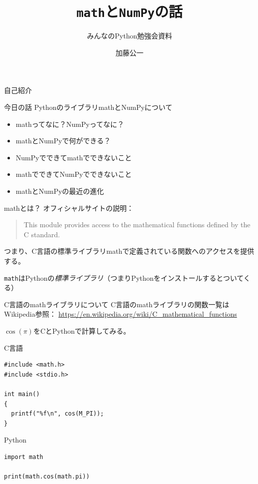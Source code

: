 \documentclass[unicode,lualatex,aspectratio=169]{beamer}
\title{{\tt math}と{\tt NumPy}の話}
\subtitle{みんなのPython勉強会資料}
\date{}
\author{加藤公一}
\begin{document}
\begin{frame}
 \titlepage
\end{frame}
\begin{frame}[fragile]{自己紹介}
\end{frame}
\begin{frame}[fragile]{今日の話}
  PythonのライブラリmathとNumPyについて
  \begin{itemize}
  \item mathってなに？NumPyってなに？
  \item mathとNumPyで何ができる？
  \item NumPyでできてmathでできないこと
  \item mathでできてNumPyでできないこと
  \item mathとNumPyの最近の進化
  \end{itemize}
\end{frame}
\begin{frame}[fragile]{mathとは？}
  オフィシャルサイトの説明：
  \begin{quote}
    This module provides access to the mathematical functions defined by the C standard.
  \end{quote}

  つまり、C言語の標準ライブラリmathで定義されている関数へのアクセスを提供する。

  {\tt math}はPythonの\emph{標準ライブラリ}（つまりPythonをインストールするとついてくる）
\end{frame}
\begin{frame}[fragile]{C言語のmathライブラリについて}
  C言語のmathライブラリの関数一覧はWikipedia参照：\newline
  {\tiny \url{https://en.wikipedia.org/wiki/C\_mathematical\_functions}}

$\cos(\pi)$をCとPythonで計算してみる。
\begin{minipage}[t]{0.45 \textwidth}
\fontsize{6pt}{6pt}\selectfont    
\noindent  
C言語
\begin{verbatim}
#include <math.h>
#include <stdio.h>

int main()
{
  printf("%f\n", cos(M_PI));
}
\end{verbatim}
\end{minipage}
\begin{minipage}[t]{0.45 \textwidth}
\fontsize{6pt}{6pt}\selectfont    
\noindent  
Python
\begin{verbatim}
import math

print(math.cos(math.pi))
\end{verbatim}
\end{minipage}
\end{frame}
\end{document}
